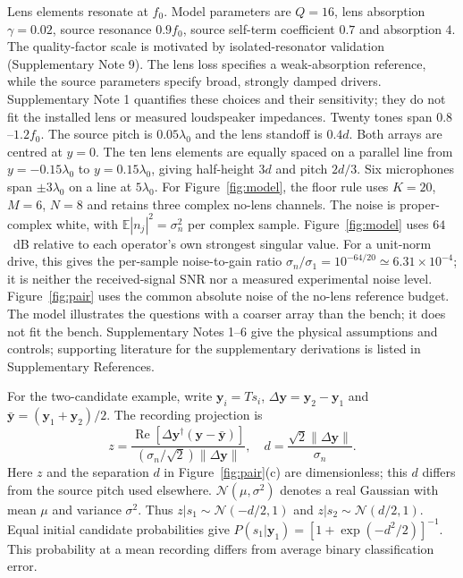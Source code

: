 \documentclass[lineno,pdflatex,sn-nature]{sn-jnl}%
\theoremstyle{thmstyleone}%
\theoremstyle{thmstyletwo}%
\theoremstyle{thmstylethree}%
\begin{document}
Lens elements resonate at $f_0$. Model parameters are $Q=16$, lens absorption $\gamma=0.02$, source resonance $0.9f_0$, source self-term coefficient $0.7$ and absorption $4$. The quality-factor scale is motivated by isolated-resonator validation (Supplementary Note 9). The lens loss specifies a weak-absorption reference, while the source parameters specify broad, strongly damped drivers. Supplementary Note 1 quantifies these choices and their sensitivity; they do not fit the installed lens or measured loudspeaker impedances. Twenty tones span $0.8$--$1.2f_0$. The source pitch is $0.05\lambda_0$ and the lens standoff is $0.4d$. Both arrays are centred at $y=0$. The ten lens elements are equally spaced on a parallel line from $y=-0.15\lambda_0$ to $y=0.15\lambda_0$, giving half-height $3d$ and pitch $2d/3$. Six microphones span $\pm3\lambda_0$ on a line at $5\lambda_0$. For Figure~\ref{fig:model}, the floor rule uses $K=20$, $M=6$, $N=8$ and retains three complex no-lens channels. The noise is proper-complex white, with $\mathbb E|n_j|^2=\sigma_n^2$ per complex sample. Figure~\ref{fig:model} uses $64$~dB relative to each operator's own strongest singular value. For a unit-norm drive, this gives the per-sample noise-to-gain ratio $\sigma_n/\sigma_1=10^{-64/20}\simeq6.31\times10^{-4}$; it is neither the received-signal SNR nor a measured experimental noise level. Figure~\ref{fig:pair} uses the common absolute noise of the no-lens reference budget. The model illustrates the questions with a coarser array than the bench; it does not fit the bench. Supplementary Notes 1--6 give the physical assumptions and controls; supporting literature for the supplementary derivations is listed in Supplementary References.


For the two-candidate example, write $\mathbf y_i=Ts_i$, $\Delta\mathbf y=\mathbf y_2-\mathbf y_1$ and $\bar{\mathbf y}=(\mathbf y_1+\mathbf y_2)/2$. The recording projection is
\begin{equation}
 z=\frac{\operatorname{Re}[\Delta\mathbf y^\dagger(\mathbf y-\bar{\mathbf y})]}{(\sigma_n/\sqrt2)\|\Delta\mathbf y\|},\quad
 d=\frac{\sqrt2\|\Delta\mathbf y\|}{\sigma_n}.
\end{equation}
Here $z$ and the separation $d$ in Figure~\ref{fig:pair}(c) are dimensionless; this $d$ differs from the source pitch used elsewhere. $\mathcal N(\mu,\sigma^2)$ denotes a real Gaussian with mean $\mu$ and variance $\sigma^2$. Thus $z|s_1\sim\mathcal N(-d/2,1)$ and $z|s_2\sim\mathcal N(d/2,1)$. Equal initial candidate probabilities give $P(s_1|\mathbf y_1)=[1+\exp(-d^2/2)]^{-1}$. This probability at a mean recording differs from average binary classification error.
\end{document}
